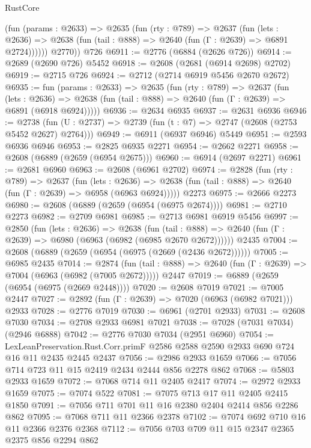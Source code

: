 \begin{lexlean}{RustCore}
\begin{coremodule}
          (fun (params : @2633) =>
          @2635
            (fun (rty : @789) =>
            @2637
              (fun (lets : @2636) =>
              @2638 (fun (tail : @888) => @2640 (fun (Γ : @2639) => @6891 @2724))))))
        @2770))
    @726
@6911 := @2776 (@6884 (@2626 @726))
@6914 := @2689 (@2690 @726) @5452
@6918 := @2608 (@2681 (@6914 @2698) @2702)
@6919 := @2715 @726
@6924 := @2712 (@2714 @6919 @5456 @2670 @2672)
@6935 := fun (params : @2633) =>
  @2635
    (fun (rty : @789) =>
    @2637
      (fun (lets : @2636) =>
      @2638 (fun (tail : @888) => @2640 (fun (Γ : @2639) => @6891 (@6918 @6924)))))
@6936 := @2634 @6935
@6937 := @2631 @6936
@6946 := @2738 (fun (U : @2737) => @2739 (fun (t : @7) => @2747 (@2608 (@2753 @5452 @2627) @2764)))
@6949 := @6911 (@6937 @6946) @5449
@6951 := @2593 @6936 @6946
@6953 := @2825 @6935 @2271
@6954 := @2662 @2271
@6958 := @2608 (@6889 (@2659 (@6954 @2675)))
@6960 := @6914 (@2697 @2271)
@6961 := @2681 @6960
@6963 := @2608 (@6961 @2702)
@6974 := @2828
    (fun (rty : @789) =>
    @2637
      (fun (lets : @2636) =>
      @2638 (fun (tail : @888) => @2640 (fun (Γ : @2639) => @6958 (@6963 @6924)))))
    @2273
@6975 := @2666 @2273
@6980 := @2608 (@6889 (@2659 (@6954 (@6975 @2674))))
@6981 := @2710 @2273
@6982 := @2709 @6981
@6985 := @2713 @6981 @6919 @5456
@6997 := @2850
    (fun (lets : @2636) =>
    @2638
      (fun (tail : @888) => @2640 (fun (Γ : @2639) => @6980 (@6963 (@6982 (@6985 @2670 @2672))))))
    @2435
@7004 := @2608 (@6889 (@2659 (@6954 (@6975 (@2669 (@2436 @2672))))))
@7005 := @6985 @2435
@7014 := @2874
    (fun (tail : @888) => @2640 (fun (Γ : @2639) => @7004 (@6963 (@6982 (@7005 @2672)))))
    @2447
@7019 := @6889 (@2659 (@6954 (@6975 (@2669 @2448))))
@7020 := @2608 @7019
@7021 := @7005 @2447
@7027 := @2892 (fun (Γ : @2639) => @7020 (@6963 (@6982 @7021))) @2933
@7028 := @2776 @7019
@7030 := @6961 (@2701 @2933)
@7031 := @2608 @7030
@7034 := @2708 @2933 @6981 @7021
@7038 := @7028 (@7031 @7034) (@2946 @6888)
@7042 := @2776 @7030 @7034 (@2951 @6960)
@7054 := LexLeanPreservation.Rust.Corr.primF
    @2586
    @2588
    @2590
    @2933
    @690
    @724
    @16
    @11
    @2435
    @2445
    @2437
@7056 := @2986 @2933 @1659
@7066 := @7056 @714 @723 @11 @15 @2419 @2434 @2444 @856 @2278 @862
@7068 := @5803 @2933 @1659
@7072 := @7068 @714 @11 @2405 @2417
@7074 := @2972 @2933 @1659
@7075 := @7074 @522
@7081 := @7075 @713 @17 @11 @2405 @2415 @1850
@7091 := @7056 @711 @701 @11 @16 @2380 @2404 @2414 @856 @2286 @862
@7095 := @7068 @711 @11 @2366 @2378
@7102 := @7074 @692 @710 @16 @11 @2366 @2376 @2368
@7112 := @7056 @703 @709 @11 @15 @2347 @2365 @2375 @856 @2294 @862

\end{coremodule}
\end{lexlean}
